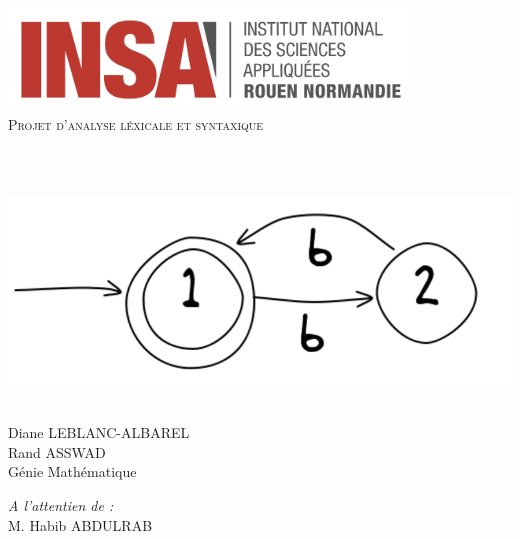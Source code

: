 \begin{titlepage}
    \begin{sffamily}
        \begin{center}
            \includegraphics[width=0.8\textwidth]{img/logo}\\[2cm]

            \textsc{\huge Projet d'analyse léxicale et syntaxique}\\[1cm]

            \HRule \\[0.4cm]
            {\huge \bfseries \@title \\[0.4cm]}
            \HRule \\[3cm]

            \includegraphics[width=.6\textwidth]{img/cover_img}~\\[2cm]

            \begin{minipage}{0.4\textwidth}
            \begin{flushleft} \large
                Diane LEBLANC-ALBAREL\\
                Rand ASSWAD\\
                Génie Mathématique
            \end{flushleft}
            \end{minipage}
            \begin{minipage}{0.4\textwidth}
            \begin{flushright} \large
                \emph{A l'attentien de :}\\
                M. Habib ABDULRAB
            \end{flushright}
            \end{minipage}

            \vfill
            {\large \@date}
        \end{center}
    \end{sffamily}
\end{titlepage}
\makeatother
